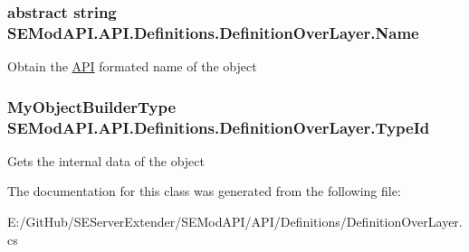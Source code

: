\subsubsection[{Name}]{\setlength{\rightskip}{0pt plus 5cm}abstract string S\+E\+Mod\+A\+P\+I.\+A\+P\+I.\+Definitions.\+Definition\+Over\+Layer.\+Name\hspace{0.3cm}{\ttfamily [get]}}\label{class_s_e_mod_a_p_i_1_1_a_p_i_1_1_definitions_1_1_definition_over_layer_a0b043350c7aa95d62740095e50d01bf2}


Obtain the \hyperlink{namespace_s_e_mod_a_p_i_1_1_a_p_i}{A\+P\+I} formated name of the object 

\hypertarget{class_s_e_mod_a_p_i_1_1_a_p_i_1_1_definitions_1_1_definition_over_layer_ad330405e8176ccb6c5b02e97454bf946}{}
\subsubsection[{Type\+Id}]{\setlength{\rightskip}{0pt plus 5cm}My\+Object\+Builder\+Type S\+E\+Mod\+A\+P\+I.\+A\+P\+I.\+Definitions.\+Definition\+Over\+Layer.\+Type\+Id\hspace{0.3cm}{\ttfamily [get]}}\label{class_s_e_mod_a_p_i_1_1_a_p_i_1_1_definitions_1_1_definition_over_layer_ad330405e8176ccb6c5b02e97454bf946}


Gets the internal data of the object 



The documentation for this class was generated from the following file\+:\begin{DoxyCompactItemize}
\item 
E\+:/\+Git\+Hub/\+S\+E\+Server\+Extender/\+S\+E\+Mod\+A\+P\+I/\+A\+P\+I/\+Definitions/Definition\+Over\+Layer.\+cs\end{DoxyCompactItemize}
